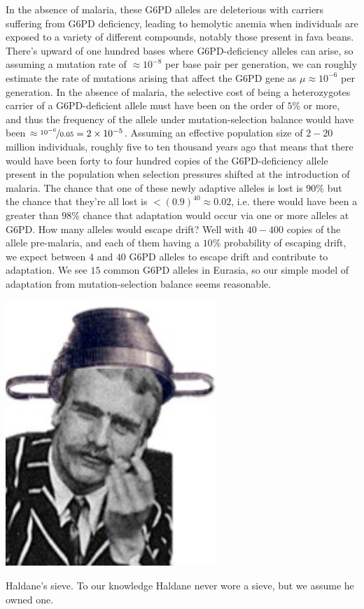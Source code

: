 {In the absence of malaria, these G6PD alleles are deleterious with
carriers suffering from G6PD deficiency,
leading to hemolytic anemia when individuals are exposed to a variety of different compounds, notably those present in fava beans.
There's upward of one hundred bases where G6PD-deficiency alleles can arise, so assuming a mutation rate of $\approx 10^{-8}$ per base pair per
generation, we can roughly estimate the rate of mutations arising that affect the G6PD gene as $\mu \approx
10^{-6}$ per generation. In the absence of malaria, the selective cost of being a heterozygotes carrier of a G6PD-deficient allele must have been on the order of
$5\%$ or more, and thus the frequency of the allele under
mutation-selection balance would have been $\approx \nicefrac{10^{-6}}{0.05} =2
\times 10^{-5}$. Assuming an effective population size of  $2-20$ million
individuals, roughly five to ten thousand years ago that means that
there would have been forty to four hundred copies of the G6PD-deficiency
allele present in the population when selection pressures shifted at the introduction of malaria. The
chance that one of these newly adaptive alleles is lost
is $90\%$ but the chance that they're all lost is $<(0.9)^{40}\approx 0.02$, i.e. there would have been a
greater than $98\%$ chance that adaptation would occur via one or more
alleles at G6PD. How many alleles would escape drift? Well with $40 - 400$
copies of the allele pre-malaria, and each of them having a $10\%$
probability of escaping drift, we expect between $4$ and $40$ G6PD
alleles to escape drift and contribute to adaptation. We see $15$ common G6PD
alleles in Eurasia, so our simple model of adaptation from
mutation-selection balance seems reasonable.   

\begin{marginfigure}
  \begin{center}
    \includegraphics[width=0.6\textwidth]{figures/haldanes_sieve.png}
\end{center}
\caption{Haldane's sieve. To our knowledge Haldane never wore a sieve, but we assume he owned one.} \label{fig:haldanes_sieve}
\end{marginfigure}

}
